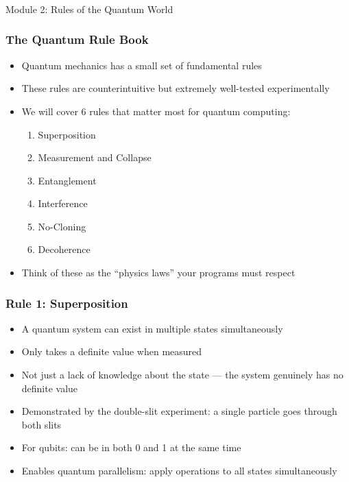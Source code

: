 
\begin{frame}[fragile]\frametitle{}
\begin{center}
{\Large Module 2: Rules of the Quantum World}
\end{center}
\end{frame}

\begin{frame}[fragile]\frametitle{The Quantum Rule Book}
\begin{itemize}
\item Quantum mechanics has a small set of fundamental rules
\item These rules are counterintuitive but extremely well-tested experimentally
\item We will cover 6 rules that matter most for quantum computing:
  \begin{enumerate}
  \item Superposition
  \item Measurement and Collapse
  \item Entanglement
  \item Interference
  \item No-Cloning
  \item Decoherence
  \end{enumerate}
\item Think of these as the ``physics laws'' your programs must respect
\end{itemize}
\end{frame}

\begin{frame}[fragile]\frametitle{Rule 1: Superposition}
\begin{itemize}
\item A quantum system can exist in multiple states simultaneously
\item Only takes a definite value when measured
\item Not just a lack of knowledge about the state --- the system genuinely has no definite value
\item Demonstrated by the double-slit experiment: a single particle goes through both slits
\item For qubits: can be in both 0 and 1 at the same time
\item Enables quantum parallelism: apply operations to all states simultaneously
\end{itemize}
\end{frame}

